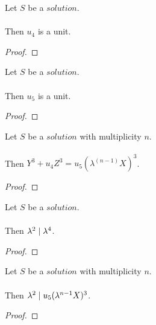 \begin{lemma}
    \label{lmm:u₄_isUnit}
    \leanok
    Let $S$ be a $solution$.\\\\
    Then $u_4$ is a unit.
\end{lemma}
\begin{proof}
    \leanok
\end{proof}

\begin{lemma}
    \label{lmm:u₅_isUnit}
    \leanok
    Let $S$ be a $solution$.\\\\
    Then $u_5$ is a unit.
\end{lemma}
\begin{proof}
    \leanok
\end{proof}

\begin{lemma}
    \label{lmm:formula2}
    \leanok
    Let $S$ be a $solution$ with multiplicity $n$.\\\\
    Then $Y^3 + u_4 Z^3 = u_5 (\lambda^(n-1) X)^3$.
\end{lemma}
\begin{proof}
    \leanok
\end{proof}

\begin{lemma}
    \label{lmm:lambda_sq_div_lambda_fourth}
    \leanok
    Let $S$ be a $solution$.\\\\
    Then $\lambda^2 \mid \lambda^4$.
\end{lemma}
\begin{proof}
    \leanok
\end{proof}

\begin{lemma}
    \label{lmm:lambda_sq_div_new_X_cubed}
    \leanok
    Let $S$ be a $solution$ with multiplicity $n$.\\\\
    Then $\lambda^2 \mid u_5 (\lambda^{n - 1} X)^3$.
\end{lemma}
\begin{proof}
    \leanok
\end{proof}

